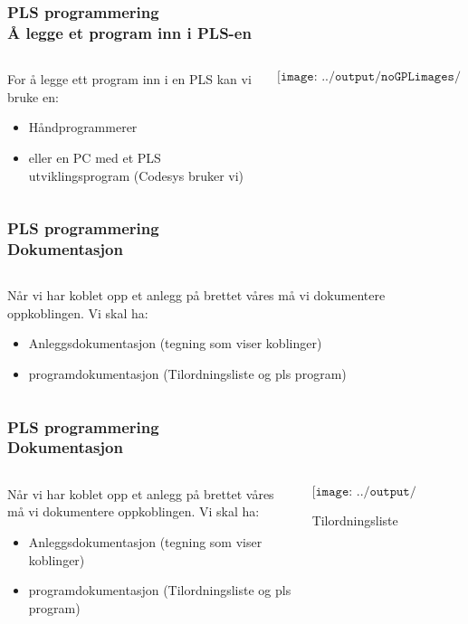 \documentclass[aspectratio=169,xcolor=dvipsnames]{beamer}
\begin{document}
\begin{frame}
	\frametitle{PLS programmering \\ Å legge et program inn i PLS-en}
	\begin{columns}
		\begin{column}{0.3\textwidth}
			For å legge ett program inn i en PLS kan vi bruke en:
			\begin{itemize}
				\item Håndprogrammerer
				\item eller en PC med et PLS utviklingsprogram (Codesys bruker vi)
			\end{itemize}

			
		\end{column}

		\begin{column}{0.7\textwidth}
	$$\texttt{[image: ../output/noGPLimages/pTIFPLCx01.jpg]}$$
		\end{column}
	\end{columns}
\end{frame}
\begin{frame}
	\frametitle{PLS programmering \\ Dokumentasjon}
	\begin{columns}
		\begin{column}{0.3\textwidth}
			Når vi har koblet opp et anlegg på brettet våres må vi dokumentere oppkoblingen. Vi skal ha: 
			\begin{itemize}
				\item Anleggsdokumentasjon (tegning som viser koblinger)
				\item programdokumentasjon (Tilordningsliste og pls program)
			\end{itemize}

			
		\end{column}

		\begin{column}{0.7\textwidth}
		\end{column}
	\end{columns}
\end{frame}
\begin{frame}
	\frametitle{PLS programmering \\ Dokumentasjon}
	\begin{columns}
		\begin{column}{0.3\textwidth}
			Når vi har koblet opp et anlegg på brettet våres må vi dokumentere oppkoblingen. Vi skal ha: 
			\begin{itemize}
				\item Anleggsdokumentasjon (tegning som viser koblinger)
				\item programdokumentasjon (Tilordningsliste og pls program)
			\end{itemize}

			
		\end{column}

		\begin{column}{0.7\textwidth}
	$$\texttt{[image: ../output/noGPLimages/pTIFPLCx03.png]}$$
	\begin{center}
	Tilordningsliste
	\end{center}
		\end{column}
	\end{columns}
\end{frame}
\end{document}
